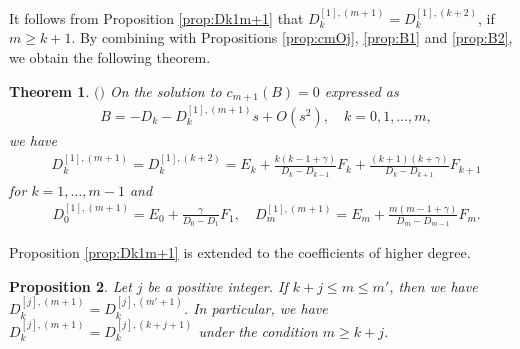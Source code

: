 \documentclass[12pt]{amsart}
\numberwithin{equation}{section}
\newtheorem{thm}{Theorem}[section]
\newtheorem{prop}[thm]{Proposition}
\theoremstyle{definition}
\theoremstyle{remark}
\begin{document}
It follows from Proposition \ref{prop:Dk1m+1} that $D_k^{[1],(m+1)} = D_k^{[1],(k+2)}  $, if  $m \geq k+1$.
By combining with Propositions \ref{prop:cmOj}, \ref{prop:B1} and \ref{prop:B2}, we obtain the following theorem.
\begin{thm} $($\cite{M}$)$ \label{thm:B}
On the solution to $c_{m+1}(B)= 0 $ expressed as
\begin{align}
& B = -D_{k} - D_k^{[1],(m+1)} s +O(s^2), \quad k=0,1,\dots , m,
\end{align}
we have
\begin{align}
& D_k^{[1],(m+1)} = D_k^{[1],(k+2)} = E_{k}+\frac{k(k-1+\gamma)}{D_{k}-D_{k-1}}F_{k}+\frac{(k+1)(k+\gamma)}{D_{k} -D_{k+1}}F_{k+1} 
\end{align}
for $k=1,\dots ,m-1$ and 
\begin{align}
& D_0^{[1],(m+1)} = E_{0}+\frac{\gamma }{D_{0} -D_{1}}F_{1} , \quad  D_m^{[1],(m+1)} = E_{m}+\frac{m(m-1+\gamma)}{D_{m}-D_{m-1}}F_{m}.
\end{align}


\end{thm}
Proposition \ref{prop:Dk1m+1} is extended to the coefficients of higher degree.
\begin{prop} \label{prop:Dkjm+1}
Let $j $ be a positive integer.
If $k + j \leq m  \leq m' $, then we have $D_k^{[j],(m+1)} = D_k^{[j],(m'+1)}  $.
In particular, we have $D_k^{[j],(m+1)} = D_k^{[j],(k+j+1)}$ under the condition $m \geq k + j $.
\end{prop}
\end{document}
